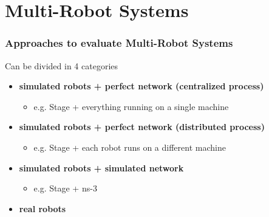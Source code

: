 \section{Multi-Robot Systems}

\begin{frame}
	\frametitle{Approaches to evaluate Multi-Robot Systems}
	
	Can be divided in 4 categories
	\vspace{0.2cm}
	
	\begin{itemize}
		\large
		\item \textbf{simulated robots + perfect network (centralized process)}
		
		\begin{itemize}
			\small \item e.g. Stage + everything running on a single machine
		\end{itemize}
		
		\vspace{0.05cm}
		\item \textbf{simulated robots + perfect network (distributed process)}
		
		\begin{itemize}
			\small \item e.g. Stage + each robot runs on a different machine
		\end{itemize}
		
		\vspace{0.05cm}
		\item \textbf{simulated robots + simulated network}
		
		\begin{itemize}
			\small \item e.g. Stage + ns-3
		\end{itemize}
		
		\vspace{0.05cm}
		\item \textbf{real robots}
	\end{itemize}
\end{frame}

